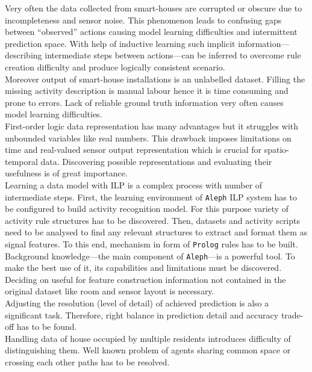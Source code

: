 \documentclass[12pt, a4paper, pdflatex, leqno, twoside, openright]{report}
\begin{document}
Very often the data collected from smart-houses are corrupted or obscure due to incompleteness and sensor noise. This phenomenon leads to confusing gaps between ``observed'' actions causing model learning difficulties and intermittent prediction space. With help of inductive learning such implicit information---describing intermediate steps between actions---can be inferred to overcome rule creation difficulty and produce logically consistent scenario.\\
Moreover output of smart-house installations is an unlabelled dataset. Filling the missing activity description is manual labour hence it is time consuming and prone to errors. Lack of reliable ground truth information very often causes model learning difficulties.\\

First-order logic data representation has many advantages but it struggles with unbounded variables like real numbers. This drawback imposes limitations on time and real-valued sensor output representation which is crucial for spatio-temporal data. Discovering possible representations and evaluating their usefulness is of great importance.\\

Learning a data model with ILP is a complex process with number of intermediate steps. First, the learning environment of \texttt{Aleph} ILP system has to be configured to build activity recognition model. For this purpose variety of activity rule structures has to be discovered. Then, datasets and activity scripts need to be analysed to find any relevant structures to extract and format them as signal features. To this end, mechanism in form of \texttt{Prolog} rules has to be built.\\
Background knowledge---the main component of \texttt{Aleph}---is a powerful tool. To make the best use of it, its capabilities and limitations must be discovered. Deciding on useful for feature construction information not contained in the original dataset like room and sensor layout is necessary.\\

Adjusting the resolution (level of detail) of achieved prediction is also a significant task. Therefore, right balance in prediction detail and accuracy trade-off has to be found.\\
Handling data of house occupied by multiple residents introduces difficulty of distinguishing them. Well known problem of agents sharing common space or crossing each other paths has to be resolved.\\
\end{document}
